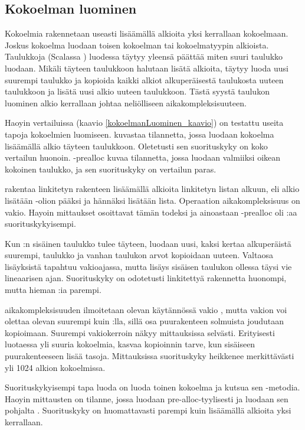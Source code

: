 \subsection{Kokoelman luominen}
Kokoelmia rakennetaan useasti lisäämällä alkioita yksi kerrallaan kokoelmaan. Joskus kokoelma luodaan toisen kokoelman tai kokoelmatyypin alkioista. Taulukkoja (Scalassa ) luodessa täytyy yleensä päättää miten suuri taulukko luodaan. Mikäli täyteen taulukkoon halutaan lisätä alkioita, täytyy luoda uusi suurempi taulukko ja kopioida kaikki alkiot alkuperäisestä taulukosta uuteen taulukkoon ja lisätä uusi alkio uuteen taulukkoon. Tästä syystä taulukon luominen alkio kerrallaan johtaa neliölliseen aikakompleksisuuteen.

Haoyin vertailuissa\cite{haoyiBenchmark} (kaavio \ref{kokoelmanLuominen_kaavio}) on testattu useita tapoja kokoelmien luomiseen.  kuvastaa tilannetta, jossa luodaan kokoelma lisäämällä alkio täyteen taulukkoon. Oletetusti sen suorituskyky on koko vertailun huonoin. -prealloc kuvaa tilannetta, jossa luodaan valmiiksi oikean kokoinen taulukko, ja sen suorituskyky on vertailun paras.

 rakentaa linkitetyn rakenteen lisäämällä alkioita linkitetyn listan alkuun, eli alkio lisätään \code{::}-olion pääksi ja hännäksi lisätään lista. Operaation aikakompleksisuus on vakio. \cite{scalaCollections} Hayoin mittaukset osoittavat tämän todeksi ja ainoastaan -prealloc oli :aa suorituskykyisempi.

Kun :n sisäinen taulukko tulee täyteen, luodaan uusi, kaksi kertaa alkuperäistä suurempi, taulukko ja vanhan taulukon arvot kopioidaan uuteen. Valtaosa lisäyksistä tapahtuu vakioajassa, mutta lisäys sisäisen taulukon ollessa täysi vie lineaarisen ajan. Suorituskyky on odotetusti linkitettyä rakennetta huonompi, mutta hieman :ia parempi.

 aikakompleksisuuden ilmoitetaan olevan käytännössä vakio \cite{scalaCollections}, mutta vakion voi olettaa olevan suurempi kuin :lla, sillä osa puurakenteen solmuista joudutaan kopioimaan.  Suurempi vakiokerroin näkyy mittauksissa selvästi. Erityisesti luotaessa yli suuria kokoelmia, kasvaa kopioinnin tarve, kun sisäiseen puurakenteeseen lisää tasoja. Mittauksissa suorituskyky heikkenee merkittävästi yli 1024 alkion kokoelmissa.

Suorituskykyisempi tapa luoda  on luoda toinen kokoelma ja kutsua sen -metodia. Haoyin\cite{haoyiBenchmark} mittausten  on tilanne, jossa luodaan  pre-alloc-tyylisesti ja luodaan sen pohjalta . Suorituskyky on huomattavasti parempi kuin lisäämällä alkioita yksi kerrallaan.

